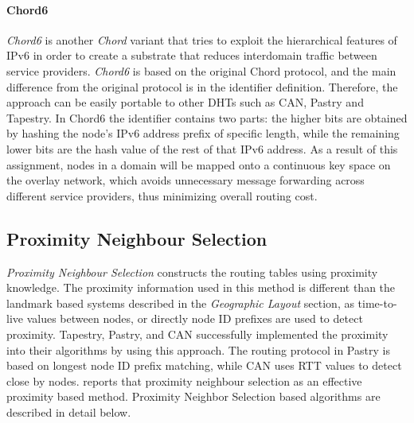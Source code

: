 \paragraph*{\bf Chord6}
\emph{Chord6} \cite{xiong_chord6_2005} is another \textit{Chord} variant that
tries to exploit the hierarchical features of IPv6 in order to create a
substrate that reduces interdomain traffic between service providers.
\textit{Chord6} is based on the original Chord protocol, and the main difference
from the original protocol is in the identifier definition. Therefore, the
approach can be easily portable to other DHTs such as CAN, Pastry and Tapestry.
In Chord6 the identifier contains two parts: the higher bits are obtained by
hashing the node's IPv6 address prefix of specific length, while the remaining
lower bits are the hash value of the rest of that IPv6 address. As a result of
this assignment, nodes in a domain will be mapped onto a continuous key space on
the overlay network, which avoids unnecessary message forwarding across
different service providers, thus minimizing overall routing cost.

\subsection{Proximity Neighbour Selection}\label{sec:pns}

\textit{Proximity Neighbour Selection} constructs the routing tables using
proximity knowledge. The proximity information used in this method is different
than the landmark based systems described in the \textit{Geographic Layout}
section, as time-to-live values between nodes, or directly node ID prefixes are
used to detect proximity.  Tapestry, Pastry, and CAN successfully implemented
the proximity into their algorithms by using this approach.  The routing
protocol in Pastry is based on longest node ID prefix matching, while CAN uses
RTT values to detect close by nodes. \cite{castro_proximityp2p_2002}  reports
that proximity neighbour selection as an effective proximity based method.
Proximity Neighbor Selection based algorithms are described in detail below.


